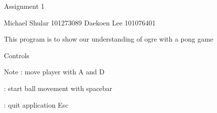 Assignment 1

Michael Shular 101273089 Daekoen Lee 101076401

This program is to show our understanding of ogre with a pong game

Controls \begin{DoxyNote}{Note}
\+: move player with A and D 

\+: start ball movement with spacebar 

\+: quit application Esc 
\end{DoxyNote}
